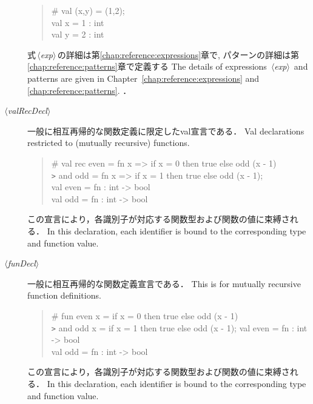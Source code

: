 \documentclass{jbook}
\newcommand{\nonterm}[1]{\mbox{$\,\langle$}{\it #1}\mbox{$\rangle\,$}}
\newenvironment{program}{\begin{quote}\begin{tt}}%
                        {\end{tt}\end{quote}}
\begin{document}
\begin{description}
\begin{program}
  \# val (x,y) = (1,2);\\
  val x = 1 : int\\
  val y = 2 : int
\end{program}

\ifjp%
	式\nonterm{exp}の詳細は第\ref{chap:reference:expressions}章で,
パターンの詳細は第\ref{chap:reference:patterns}章で定義する
\else%
	The details of expressions \nonterm{exp} and patterns are given
in Chapter~\ref{chap:reference:expressions} and
\ref{chap:reference:patterns}.
\fi%
．
\item[\nonterm{valRecDecl}] 
\ifjp%
	一般に相互再帰的な関数定義に限定したval宣言である．
\else%
	Val declarations restricted to (mutually recursive) functions.
\fi%
\begin{program}
  \# val rec even = fn x => if x = 0 then true else odd (x - 1)\\
  \verb|>| and odd = fn x => if x = 1 then true else odd (x - 1);\\
  val even = fn : int -> bool\\
  val odd = fn : int -> bool\\
\end{program}
\ifjp%
	この宣言により，各識別子が対応する関数型および関数の値に束縛される．
\else%
	In this declaration, each identifier is bound to the
corresponding type and function value.
\fi%

\item[\nonterm{funDecl}] 
\ifjp%
	一般に相互再帰的な関数定義宣言である．
\else%
	This is for mutually recursive function definitions.
\fi%
\begin{program}
  \# fun even x = if x = 0 then true else odd (x - 1)\\
  \verb|>| and odd x = if x = 1 then true else odd (x - 1);
  val even = fn : int -> bool\\
  val odd = fn : int -> bool\\
\end{program}
\ifjp%
	この宣言により，各識別子が対応する関数型および関数の値に束縛される．
\else%
	In this declaration, each identifier is bound to the
corresponding type and function value.
\fi%


\end{description}
\end{document}
